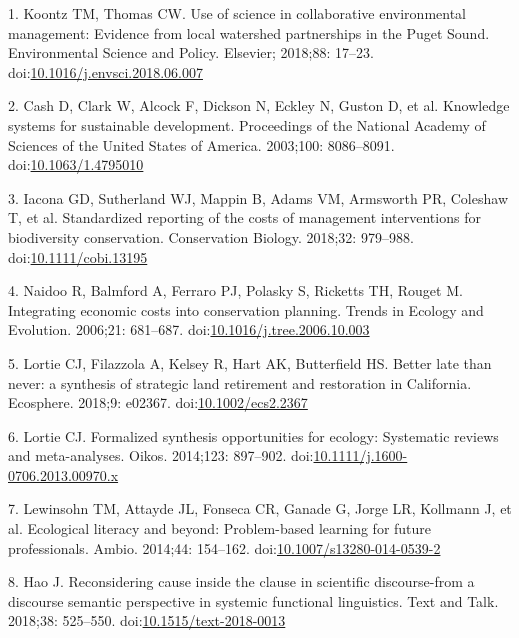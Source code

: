 \documentclass[10pt,letterpaper]{article}
\begin{document}
\hypertarget{refs}{}
\hypertarget{ref-Koontz2018}{}
1. Koontz TM, Thomas CW. Use of science in collaborative environmental
management: Evidence from local watershed partnerships in the Puget
Sound. Environmental Science and Policy. Elsevier; 2018;88: 17--23.
doi:\href{https://doi.org/10.1016/j.envsci.2018.06.007}{10.1016/j.envsci.2018.06.007}

\hypertarget{ref-Cash2003}{}
2. Cash D, Clark W, Alcock F, Dickson N, Eckley N, Guston D, et al.
Knowledge systems for sustainable development. Proceedings of the
National Academy of Sciences of the United States of America. 2003;100:
8086--8091.
doi:\href{https://doi.org/10.1063/1.4795010}{10.1063/1.4795010}

\hypertarget{ref-Iacona2018}{}
3. Iacona GD, Sutherland WJ, Mappin B, Adams VM, Armsworth PR, Coleshaw
T, et al. Standardized reporting of the costs of management
interventions for biodiversity conservation. Conservation Biology.
2018;32: 979--988.
doi:\href{https://doi.org/10.1111/cobi.13195}{10.1111/cobi.13195}

\hypertarget{ref-Naidoo2006}{}
4. Naidoo R, Balmford A, Ferraro PJ, Polasky S, Ricketts TH, Rouget M.
Integrating economic costs into conservation planning. Trends in Ecology
and Evolution. 2006;21: 681--687.
doi:\href{https://doi.org/10.1016/j.tree.2006.10.003}{10.1016/j.tree.2006.10.003}

\hypertarget{ref-Lortie2018}{}
5. Lortie CJ, Filazzola A, Kelsey R, Hart AK, Butterfield HS. Better
late than never: a synthesis of strategic land retirement and
restoration in California. Ecosphere. 2018;9: e02367.
doi:\href{https://doi.org/10.1002/ecs2.2367}{10.1002/ecs2.2367}

\hypertarget{ref-Lortie2014}{}
6. Lortie CJ. Formalized synthesis opportunities for ecology: Systematic
reviews and meta-analyses. Oikos. 2014;123: 897--902.
doi:\href{https://doi.org/10.1111/j.1600-0706.2013.00970.x}{10.1111/j.1600-0706.2013.00970.x}

\hypertarget{ref-Lewinsohn2014}{}
7. Lewinsohn TM, Attayde JL, Fonseca CR, Ganade G, Jorge LR, Kollmann J,
et al. Ecological literacy and beyond: Problem-based learning for future
professionals. Ambio. 2014;44: 154--162.
doi:\href{https://doi.org/10.1007/s13280-014-0539-2}{10.1007/s13280-014-0539-2}

\hypertarget{ref-Hao2018}{}
8. Hao J. Reconsidering cause inside the clause in scientific
discourse-from a discourse semantic perspective in systemic functional
linguistics. Text and Talk. 2018;38: 525--550.
doi:\href{https://doi.org/10.1515/text-2018-0013}{10.1515/text-2018-0013}
\end{document}
